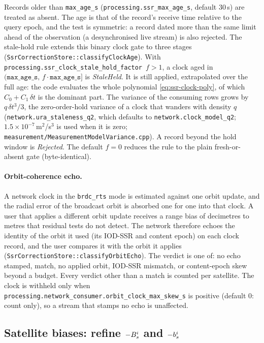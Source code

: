 \documentclass[main.tex]{subfiles}
\begin{document}
Records older than \texttt{max\_age\_s}
(\texttt{processing.ssr\_max\_age\_s}, default $30$\,s) are treated as
absent. The age is that of the record's receive time relative to the
query epoch, and the test is symmetric: a record dated more than
the same limit ahead of the observation (a desynchronised
live stream) is also rejected. The stale-hold rule extends this
binary clock gate to three stages
(\texttt{SsrCorrectionStore::classifyClockAge}). With
\texttt{processing.ssr\_clock\_stale\_hold\_factor}~$f>1$, a clock aged in
$(\texttt{max\_age\_s},\,f\cdot\texttt{max\_age\_s}]$ is \emph{StaleHeld}.
It is still applied, extrapolated over the full age: the code evaluates
the whole polynomial \eqref{eq:ssr-clock-poly}, of which
$C_0 + C_1\,\delta t$ is the dominant part. The variance of the consuming
rows grows by $q\,\delta t^{3}/3$, the zero-order-hold variance of a clock
that wanders with density $q$ (\texttt{network.ura\_staleness\_q2}, which
defaults to \texttt{network.clock\_model\_q2}; $1.5\times10^{-7}$\,m$^2$/s$^3$
is used when it is zero;
\texttt{measurement/MeasurementModelVariance.cpp}). A record beyond the
hold window is \emph{Rejected}. The default $f=0$ reduces the rule
to the plain fresh-or-absent gate (byte-identical).

\paragraph{Orbit-coherence echo.}
A network clock in the \texttt{brdc\_rts} mode is estimated against one
orbit update, and the radial error of the broadcast orbit is absorbed one for
one into that clock. A user that applies a different orbit update receives a
range bias of decimetres to metres that residual tests do not detect. The
network therefore echoes the identity of the orbit it used (its IOD-SSR and
content epoch) on each clock record, and the user compares it with the orbit it
applies (\texttt{SsrCorrectionStore::classifyOrbitEcho}). The verdict is one
of: no echo stamped, match, no applied orbit, IOD-SSR mismatch, or
content-epoch skew beyond a budget. Every verdict other than a match is
counted per satellite. The clock is withheld only when
\texttt{processing.network\_consumer.orbit\_clock\_max\_skew\_s} is positive
(default $0$: count only), so a stream that stamps no echo is unaffected.

\subsection{Satellite biases: refine $-B^i_s$ and $-b^i_s$}
\end{document}
